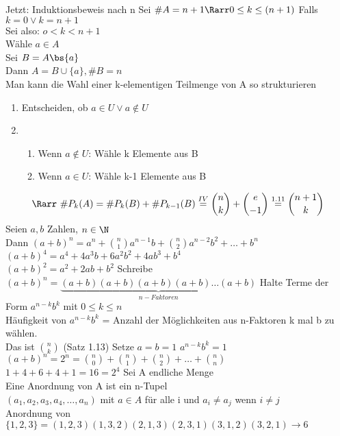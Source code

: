 Jetzt: Induktionsbeweis nach n
Sei $\#A=n+1 \Rarr 0 \leq k \leq (n+1)$
Falls $k = 0\vee k = n + 1$\\
Sei also: $o < k < n + 1$\\
Wähle $a\in A$\\
Sei $B=A\bs\{a\}$\\
Dann $A=B\cup\{a\}, \#B=n$\\
Man kann die Wahl einer k-elementigen Teilmenge von A so strukturieren
\begin{enumerate}
\item Entscheiden, ob $a\in U \vee a\notin U$
\item\begin{enumerate}
\item Wenn $a\notin U$: Wähle k Elemente aus B
\item Wenn $a\in U$: Wähle k-1 Elemente aus B
\end{enumerate}
\end{enumerate}
$$\Rarr\ \#P_k(A)=\#P_k(B)+\#P_{k-1} (B) \stackrel{IV}{=} \binom{n}{k} + \binom{e}{ -1} \stackrel{1.11}{=} \binom{n+1}{k}$$
%
Seien $a,b$ Zahlen, $n\in\N$\\
Dann $(a+b)^n=a^n+\binom{n}{1} a^{n-1} b+\binom{n}{2}a^{n-2}b^2+…+b^n$
%
\bsp
$(a+b)^4=a^4+4a^3b+6a^2b^2+4ab^3+b^4$\\
$(a+b)^2=a^2+2ab+b^2$
%
\bew
Schreibe $(a+b)^n=\underbrace{(a+b)(a+b)(a+b)(a+b)…(a+b)}_{n-Faktoren}$
%
Halte Terme der Form $a^{n-k}b^k$ mit $0\leq k\leq n$\\
Häufigkeit von $a^{n-k}b^k$ = Anzahl der Möglichkeiten aus n-Faktoren k mal b zu wählen.\\
Das ist $\binom{n}{k}$ (Satz 1.13)
%
Setze $a=b=1$ \hspace{1cm} $a^{n-k}b^k=1$\\
$(a+b)^n=2^n=\binom{n}{0}+\binom{n}{1}+\binom{n}{2}+…+\binom{n}{n}$\\
%
\bsp
$1+4+6+4+1=16=2^4$
%
Sei A endliche Menge\\
Eine Anordnung von A ist ein n-Tupel\\
$(a_1,a_2,a_3,a_4,…,a_n)$ mit $a\in A$ für alle i und $a_i\neq a_j$ wenn $i\neq j$\\
%
\bsp
Anordnung von $\{1,2,3\}=(1,2,3)(1,3,2)(2,1,3)(2,3,1)(3,1,2)(3,2,1)→6$
%
